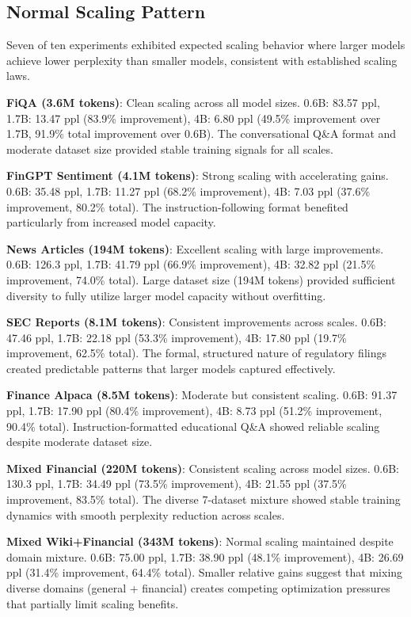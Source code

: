 \subsection{Normal Scaling Pattern}

Seven of ten experiments exhibited expected scaling behavior where larger models achieve lower perplexity than smaller models, consistent with established scaling laws.

\textbf{FiQA (3.6M tokens)}: Clean scaling across all model sizes. 0.6B: 83.57 ppl, 1.7B: 13.47 ppl (83.9\% improvement), 4B: 6.80 ppl (49.5\% improvement over 1.7B, 91.9\% total improvement over 0.6B). The conversational Q\&A format and moderate dataset size provided stable training signals for all scales.

\textbf{FinGPT Sentiment (4.1M tokens)}: Strong scaling with accelerating gains. 0.6B: 35.48 ppl, 1.7B: 11.27 ppl (68.2\% improvement), 4B: 7.03 ppl (37.6\% improvement, 80.2\% total). The instruction-following format benefited particularly from increased model capacity.

\textbf{News Articles (194M tokens)}: Excellent scaling with large improvements. 0.6B: 126.3 ppl, 1.7B: 41.79 ppl (66.9\% improvement), 4B: 32.82 ppl (21.5\% improvement, 74.0\% total). Large dataset size (194M tokens) provided sufficient diversity to fully utilize larger model capacity without overfitting.

\textbf{SEC Reports (8.1M tokens)}: Consistent improvements across scales. 0.6B: 47.46 ppl, 1.7B: 22.18 ppl (53.3\% improvement), 4B: 17.80 ppl (19.7\% improvement, 62.5\% total). The formal, structured nature of regulatory filings created predictable patterns that larger models captured effectively.

\textbf{Finance Alpaca (8.5M tokens)}: Moderate but consistent scaling. 0.6B: 91.37 ppl, 1.7B: 17.90 ppl (80.4\% improvement), 4B: 8.73 ppl (51.2\% improvement, 90.4\% total). Instruction-formatted educational Q\&A showed reliable scaling despite moderate dataset size.

\textbf{Mixed Financial (220M tokens)}: Consistent scaling across model sizes. 0.6B: 130.3 ppl, 1.7B: 34.49 ppl (73.5\% improvement), 4B: 21.55 ppl (37.5\% improvement, 83.5\% total). The diverse 7-dataset mixture showed stable training dynamics with smooth perplexity reduction across scales.

\textbf{Mixed Wiki+Financial (343M tokens)}: Normal scaling maintained despite domain mixture. 0.6B: 75.00 ppl, 1.7B: 38.90 ppl (48.1\% improvement), 4B: 26.69 ppl (31.4\% improvement, 64.4\% total). Smaller relative gains suggest that mixing diverse domains (general + financial) creates competing optimization pressures that partially limit scaling benefits.

